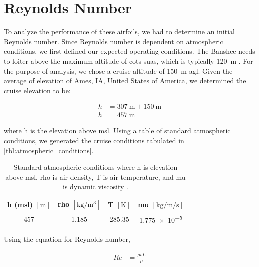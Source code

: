 \section{Reynolds Number}\label{sec:reynolds}

To analyze the performance of these airfoils, we had to determine an initial Reynolds number. Since Reynolds number is dependent on atmospheric conditions, we first defined our expected operating conditions. The Banshee needs to loiter above the maximum altitude of \acrfull{cots} \acrshort{suas}, which is typically \qty{120}{\meter} \citep{khan2024}. For the purpose of analysis, we chose a cruise altitude of \qty{150}{\meter} \acrfull{agl}. Given the average of elevation of Ames, IA, United States of America, we determined the cruise elevation to be:

\begin{align*}
    h &= \qty{307}{\meter} + \qty{150}{\meter} \\
    h &= \qty{457}{\meter}
\end{align*}

\noindent where \gls{h} is the elevation above \acrfull{msl}. Using a table of standard atmospheric conditions, we generated the cruise conditions tabulated in \autoref{tbl:atmospheric_conditions}.

\begin{table}[htpb]
    \centering
    \caption[Standard atmospheric conditions]{Standard atmospheric conditions where \gls{h} is elevation above \acrshort{msl}, \gls{rho} is air density, \gls{T} is air temperature, and \gls{mu} is dynamic viscosity \citep{auld2024}.}
    \begin{tabular}{cccc}
        \toprule
        \textbf{\gls{h} (\acrshort{msl}) $\left[\unit{\meter}\right]$} & \textbf{\gls{rho} $\left[\unit{\kilo\gram\per\meter\cubed}\right]$} & \textbf{\gls{T} $\left[\unit{\kelvin}\right]$} & \textbf{\gls{mu} $\left[\unit{\kilo\gram\per\meter\per\second}\right]$} \\
        \midrule
        \num{457} & \num{1.185} & \num{285.35} & \num{1.775e-5} \\
        \bottomrule
    \end{tabular}
    \label{tbl:atmospheric_conditions}
\end{table}

Using the equation for Reynolds number,

\begin{align}
    Re &= \frac{\rho v L}{\mu}\label{eq:reynolds}
\end{align}

